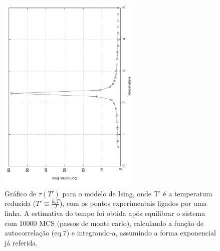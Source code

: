 \documentclass[11pt]{beamer}
\begin{document}
\begin{frame}
\frametitle{\insertsection \\ {\small \insertsubsection}}
\begin{figure}
	\centering
		\includegraphics[angle=270, width=0.6\textwidth]{images/ctimes}
	\caption{{\footnotesize Gráfico de $\tau(T')$ para o modelo de Ising, onde T' é a temperatura reduzida ($T'\equiv\frac{k_b T}{J}$), com os pontos experimentais ligados por uma linha. A estimativa do tempo foi obtida após equilibrar o sistema com 10000 MCS (passos de monte carlo), calculando a função de autocorrelação (eq.7) e integrando-a, assumindo a forma exponencial já referida.}} 
	\label{fig:1}
\end{figure}
\end{frame}
\end{document}
